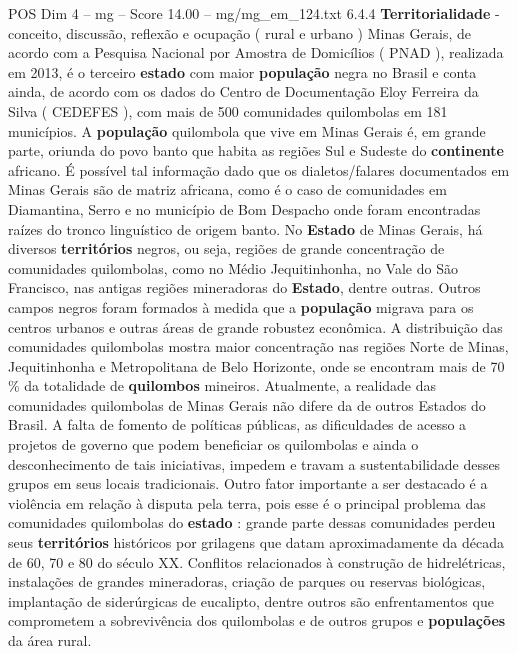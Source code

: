 \begin{textsample}{POS Dim 4 – mg – Score 14.00 – mg/mg\_em\_124.txt}  \label{ex:f4_pos_192}
6.4.4 \textbf{Territorialidade} - conceito, discussão, reflexão e ocupação ( rural e urbano ) Minas Gerais, de acordo com a Pesquisa Nacional por Amostra de Domicílios ( PNAD ), realizada em 2013, é o terceiro \textbf{estado} com maior \textbf{população} negra no Brasil e conta ainda, de acordo com os dados do Centro de Documentação Eloy Ferreira da Silva ( CEDEFES ), com mais de 500 comunidades quilombolas em 181 municípios.
A \textbf{população} quilombola que vive em Minas Gerais é, em grande parte, oriunda do povo banto que habita as regiões Sul e Sudeste do \textbf{continente} africano.
É possível tal informação dado que os dialetos/falares documentados em Minas Gerais são de matriz africana, como é o caso de comunidades em Diamantina, Serro e no município de Bom Despacho onde foram encontradas raízes do tronco linguístico de origem banto.
No \textbf{Estado} de Minas Gerais, há diversos \textbf{territórios} negros, ou seja, regiões de grande concentração de comunidades quilombolas, como no Médio Jequitinhonha, no Vale do São Francisco, nas antigas regiões mineradoras do \textbf{Estado}, dentre outras.
Outros campos negros foram formados à medida que a \textbf{população} migrava para os centros urbanos e outras áreas de grande robustez econômica.
A distribuição das comunidades quilombolas mostra maior concentração nas regiões Norte de Minas, Jequitinhonha e Metropolitana de Belo Horizonte, onde se encontram mais de 70 \% da totalidade de \textbf{quilombos} mineiros.
Atualmente, a realidade das comunidades quilombolas de Minas Gerais não difere da de outros Estados do Brasil.
A falta de fomento de políticas públicas, as dificuldades de acesso a projetos de governo que podem beneficiar os quilombolas e ainda o desconhecimento de tais iniciativas, impedem e travam a sustentabilidade desses grupos em seus locais tradicionais.
Outro fator importante a ser destacado é a violência em relação à disputa pela terra, pois esse é o principal problema das comunidades quilombolas do \textbf{estado} : grande parte dessas comunidades perdeu seus \textbf{territórios} históricos por grilagens que datam aproximadamente da década de 60, 70 e 80 do século XX.
Conflitos relacionados à construção de hidrelétricas, instalações de grandes mineradoras, criação de parques ou reservas biológicas, implantação de siderúrgicas de eucalipto, dentre outros são enfrentamentos que comprometem a sobrevivência dos quilombolas e de outros grupos e \textbf{populações} da área rural.

\end{textsample}
